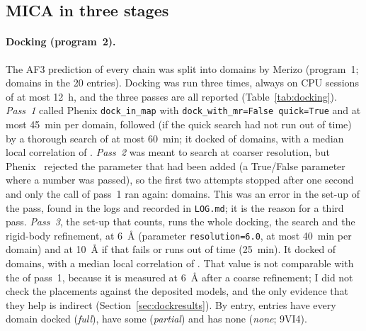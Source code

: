 \subsection{MICA in three stages}\label{sec:dockprocedure}
\paragraph{Docking (program~2).}
The AF3 prediction of every chain was split into domains by Merizo (program~1; \DockDomainsThree{} domains in the 20 entries). Docking was run three times, always on CPU sessions of at most 12~h, and the three passes are all reported (Table~\ref{tab:docking}).
\emph{Pass~1} called Phenix \texttt{dock\_in\_map} with \texttt{dock\_with\_mr=False quick=True} and at most 45~min per domain, followed (if the quick search had not run out of time) by a thorough search of at most 60~min; it docked \DockDockedOne{} of \DockDomainsOne{} domains, with a median local correlation of \DockCcMedOne{}. \emph{Pass~2} was meant to search at coarser resolution, but Phenix~\PhenixVersion{} rejected the parameter that had been added (a True/False parameter where a number was passed), so the first two attempts stopped after one second and only the call of pass~1 ran again: \DockDockedTwo{} domains. This was an error in the set-up of the pass, found in the logs and recorded in \texttt{LOG.md}; it is the reason for a third pass. \emph{Pass~3}, the set-up that counts, runs the whole docking, the search and the rigid-body refinement, at 6~\AA{} (parameter \texttt{resolution=6.0}, at most 40~min per domain) and at 10~\AA{} if that fails or runs out of time (25~min). It docked \DockDockedThree{} of \DockDomainsThree{} domains, with a median local correlation of \DockCcMedThree{}. That value is not comparable with the \DockCcMedOne{} of pass~1, because it is measured at 6~\AA{} after a coarse refinement; I did not check the placements against the deposited models, and the only evidence that they help is indirect (Section~\ref{sec:dockresults}). By entry, \DockModeFull{} entries have every domain docked (\emph{full}), \DockModePartial{} have some (\emph{partial}) and \DockModeNone{} has none (\emph{none}; 9VI4).

